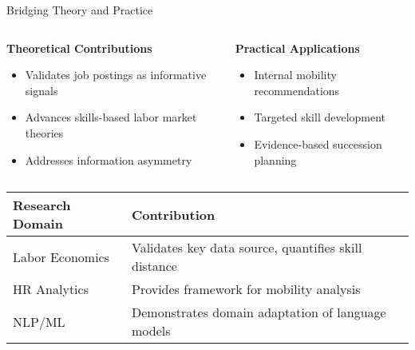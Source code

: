 \documentclass{beamer}
\begin{document}
\begin{frame}{Bridging Theory and Practice}
\begin{columns}
\begin{column}{0.48\textwidth}
\textbf{Theoretical Contributions}
\begin{itemize}
    \item Validates job postings as informative signals
    \item Advances skills-based labor market theories
    \item Addresses information asymmetry
\end{itemize}
\end{column}
\begin{column}{0.48\textwidth}
\textbf{Practical Applications}
\begin{itemize}
    \item Internal mobility recommendations
    \item Targeted skill development
    \item Evidence-based succession planning
\end{itemize}
\end{column}
\end{columns}

\begin{table}
\centering
\begin{tabular}{l l}
\toprule
\textbf{Research Domain} & \textbf{Contribution} \\
\midrule
Labor Economics & Validates key data source, quantifies skill distance \\
HR Analytics & Provides framework for mobility analysis \\
NLP/ML & Demonstrates domain adaptation of language models \\
\bottomrule
\end{tabular}
\end{table}
\end{frame}
\end{document}
